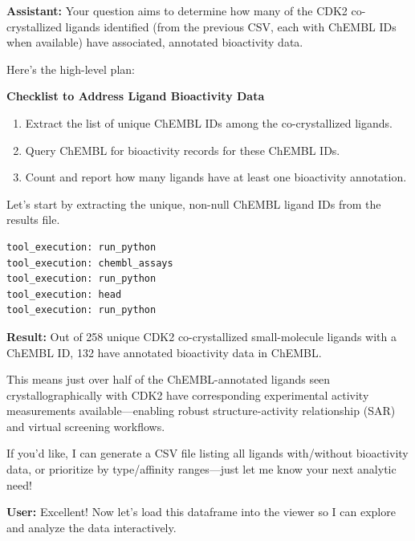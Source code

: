 \documentclass{article}
\begin{document}
\begin{assistantbox}
\textbf{Assistant:} Your question aims to determine how many of the CDK2 co-crystallized ligands identified (from the previous CSV, each with ChEMBL IDs when available) have associated, annotated bioactivity data.

Here’s the high-level plan:

\textbf{Checklist to Address Ligand Bioactivity Data}
\begin{enumerate}[label=\arabic*.]
    \item Extract the list of unique ChEMBL IDs among the co-crystallized ligands.
    \item Query ChEMBL for bioactivity records for these ChEMBL IDs.
    \item Count and report how many ligands have at least one bioactivity annotation.
\end{enumerate}

Let’s start by extracting the unique, non-null ChEMBL ligand IDs from the results file. 
\begin{verbatim}
tool_execution: run_python
tool_execution: chembl_assays
tool_execution: run_python
tool_execution: head
tool_execution: run_python
\end{verbatim}
\textbf{Result:} Out of 258 unique CDK2 co-crystallized small-molecule ligands with a ChEMBL ID, 132 have annotated bioactivity data in ChEMBL.

This means just over half of the ChEMBL-annotated ligands seen crystallographically with CDK2 have corresponding experimental activity measurements available—enabling robust structure-activity relationship (SAR) and virtual screening workflows.

If you’d like, I can generate a CSV file listing all ligands with/without bioactivity data, or prioritize by type/affinity ranges—just let me know your next analytic need!
\end{assistantbox}

\vspace{1.5em}

\begin{userbox}
\textbf{User:} Excellent! Now let's load this dataframe into the viewer so I can explore and analyze the data interactively.
\end{userbox}
\end{document}
